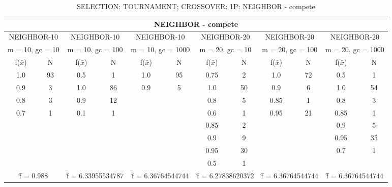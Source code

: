 \begin{table}[H]
	\centering
	\caption{SELECTION: TOURNAMENT; CROSSOVER: 1P: NEIGHBOR - compete}
	\begin{adjustbox}{width=1\textwidth}
		\begin{tabular}{ |c|c||c|c||c|c||c|c||c|c||c|c| }
			\hline
			\multicolumn{12}{|c|}{NEIGHBOR - compete} \\
			\hline
			\multicolumn{2}{|c||}{NEIGHBOR-10} & \multicolumn{2}{c||}{NEIGHBOR-10} & \multicolumn{2}{c||}{NEIGHBOR-10} & \multicolumn{2}{c||}{NEIGHBOR-20} & \multicolumn{2}{c||}{NEIGHBOR-20} & \multicolumn{2}{c|}{NEIGHBOR-20}\\
			\hline
			\multicolumn{2}{|c||}{m = 10, gc = 10} & \multicolumn{2}{c||}{m = 10, gc = 100} & \multicolumn{2}{c||}{m = 10, gc = 1000} & \multicolumn{2}{c||}{m = 20, gc = 10} & \multicolumn{2}{c||}{m = 20, gc = 100} & \multicolumn{2}{c|}{m = 20, gc = 1000}\\
			\hline
			f($\bar{x}$) & N & f($\bar{x}$) & N & f($\bar{x}$) & N & f($\bar{x}$) & N & f($\bar{x}$) & N & f($\bar{x}$) & N\\
			\hline
			\hline
			1.0 & 93 & 0.5 & 1 & 1.0 & 95 & 0.75 & 2 & 1.0 & 72 & 0.5 & 1\\
			0.9 & 3 & 1.0 & 86 & 0.9 & 5 & 1.0 & 50 & 0.9 & 6 & 1.0 & 54\\
			0.8 & 3 & 0.9 & 12 &   &   & 0.8 & 5 & 0.85 & 1 & 0.8 & 3\\
			0.7 & 1 & 0.1 & 1 &   &   & 0.6 & 1 & 0.95 & 21 & 0.85 & 1\\
			&   &   &   &   &   & 0.85 & 2 &   &   & 0.9 & 5\\
			&   &   &   &   &   & 0.9 & 9 &   &   & 0.95 & 35\\
			&   &   &   &   &   & 0.95 & 30 &   &   & 0.7 & 1\\
			&   &   &   &   &   & 0.5 & 1 &   &   &   &  \\
			\hline
			\multicolumn{2}{|c||}{\^{f} = 0.988} & \multicolumn{2}{c||}{\^{f} = 6.33955534787} & \multicolumn{2}{c||}{\^{f} = 6.36764544744} & \multicolumn{2}{c||}{\^{f} = 6.27838620372} & \multicolumn{2}{c||}{\^{f} = 6.36764544744} & \multicolumn{2}{c|}{\^{f} = 6.36764544744}\\
			\hline
		\end{tabular}
	\end{adjustbox}
\end{table}
